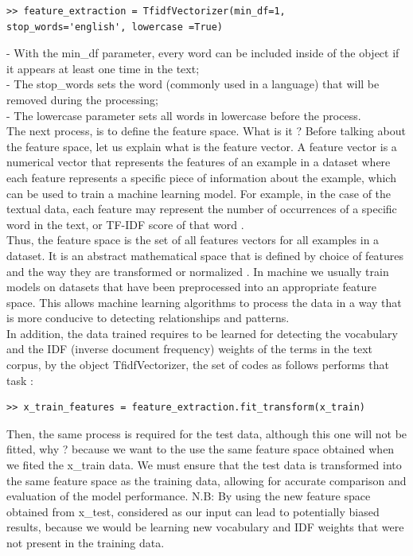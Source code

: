 \documentclass[12pt,a4paper]{article}
\begin{document}
\begin{verbatim}
>> feature_extraction = TfidfVectorizer(min_df=1,
stop_words='english', lowercase =True)   
\end{verbatim}
- With the min\_df parameter, every word can be included inside of the object if it appears at least one time in the text;\\
- The stop\_words sets the word (commonly used in a language) that will be removed during the processing;\\
- The lowercase parameter sets all words in lowercase before the process.\\

The next process, is to define the feature space. What is it ?  
Before talking about the feature space, let us explain what is the feature vector.
A feature vector is a numerical vector that represents the features of an example in a dataset where each feature represents a specific piece of information about the example, which can be used to train a machine learning model. For example, in the case of the textual data, each feature may represent the number of occurrences of a specific word in the text, or TF-IDF score of that word \cite{introducgtionMlAlpay}.\\

Thus, the feature space is the set of all features vectors for all examples in a dataset. It is an abstract mathematical space that is defined by choice of features and the way they are transformed or normalized \cite{FeatuareSpaceSoltani}. In machine we usually train models on datasets that have been preprocessed into an appropriate feature space. This allows machine learning algorithms to process the data in a way that is more conducive to detecting relationships and patterns. \\
In addition, the data trained requires to be learned for detecting the vocabulary and the IDF (inverse document frequency) weights of the terms in the text corpus, by the object TfidfVectorizer, the set of codes as follows performs that task :
\begin{verbatim}
>> x_train_features = feature_extraction.fit_transform(x_train) 
\end{verbatim}
Then, the same process is required for the test data, although this one will not be fitted, why ? because we want to the use the same feature space obtained when we fited the x\_train data. We must ensure that the test data is transformed into the same feature space as the training data, allowing for accurate comparison and evaluation of the model performance.
N.B: By using the new feature space obtained from x\_test, considered as our input can lead to potentially biased results, because we would be learning new vocabulary and IDF weights that were not present in the training data.
\end{document}
